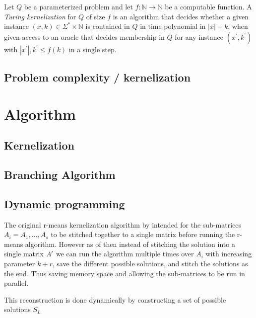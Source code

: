 \documentclass[a4paper]{article}
\begin{document}
\begin{theoremdefinition}
    Let $Q$ be a parameterized problem and let $f:\mathbb{N} \rightarrow \mathbb{N} $
    be a computable function. A \textit{Turing kernelization} for $Q$ of size $f$ is an
    algorithm that decides whether a given instance $(x,k) \in \Sigma^* \times \mathbb{N}$
    is contained in $Q$ in time polynomial in $|x|+k$, when given access to an oracle
    that decides membership in $Q$ for any instance $(x^\prime, k^\prime)$ with
    $|x^\prime|,k^\prime \leq f(k)$ in a single step. \cite[p.~314]{param_algo_book}
\end{theoremdefinition}

\subsection{Problem complexity / kernelization}

%
%
\newpage

\section{Algorithm}
\subsection{Kernelization}


\subsection{Branching Algorithm}


\subsection{Dynamic programming}
The original r-means kernelization algorithm by \cite{fomin_golovach_panolan_2020}
intended for the sub-matrices $A_i=A_1,...,A_s$ to be stitched together to a single
matrix before running the r-means algorithm. However as of \cite[Lemma 5]{fomin_golovach_panolan_2020}
then instead of stitching the solution into a single matrix $A\sp{\prime}$
we can run the algorithm multiple times over $A_i$ with increasing parameter $k+r$,
save the different possible solutions, and stitch the solutions as the end. Thus saving
memory space and allowing the sub-matrices to be run in parallel.

This reconstruction is done dynamically by constructing a set of possible solutions $S_L$

\end{document}
